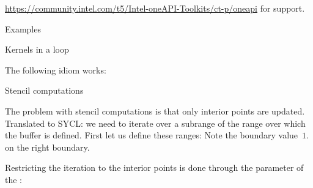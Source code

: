 \url{https://community.intel.com/t5/Intel-oneAPI-Toolkits/ct-p/oneapi}
for support.

 {Examples}

 {Kernels in a loop}

The following idiom works:
%

 {Stencil computations}

The problem with stencil computations is that only interior points are updated.
Translated to SYCL: we need to iterate over a subrange of the range over which
the buffer is defined. First let us define these ranges:
%
%
Note the boundary value~$1.$ on the right boundary.

Restricting the iteration to the interior points is done through
the  parameter of the :
%
